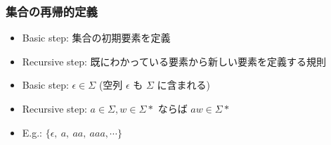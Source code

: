 \begin{frame}[fragile]
\frametitle{集合の再帰的定義}
  \begin{itemize}
\item Basic step: 集合の初期要素を定義
\item Recursive step: 既にわかっている要素から新しい要素を定義する規則
  \end{itemize}
  \begin{example}
    \begin{itemize}
\item Basic step: \(\epsilon\in\Sigma\) (空列 \(\epsilon\) も \(\Sigma\) に含まれる)
\item Recursive step: \(a\in\Sigma,w\in\Sigma*\) ならば \(aw\in\Sigma*\)
\item E.g.: \(\{\epsilon,\ a,\ aa,\ aaa,\cdots\}\)
    \end{itemize}
  \end{example}
\end{frame}
